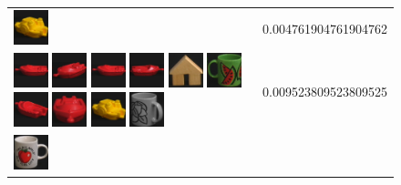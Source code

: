 \begin{figure}[tbp]
\begin{center}
\begin{tabular}{m{11cm} | m{3cm} |}
\includegraphics[width=1cm]{coil/beeld-16.eps}
& {\scriptsize 0.004761904761904762}
\\
\includegraphics[width=1cm]{coil/beeld-18.eps}
\includegraphics[width=1cm]{coil/beeld-21.eps}
\includegraphics[width=1cm]{coil/beeld-18.eps}
\includegraphics[width=1cm]{coil/beeld-19.eps}
\includegraphics[width=1cm]{coil/beeld-42.eps}
\includegraphics[width=1cm]{coil/beeld-31.eps}
\includegraphics[width=1cm]{coil/beeld-22.eps}
\includegraphics[width=1cm]{coil/beeld-20.eps}
\includegraphics[width=1cm]{coil/beeld-16.eps}
\includegraphics[width=1cm]{coil/beeld-49.eps}
& {\scriptsize 0.009523809523809525}
\\
\includegraphics[width=1cm]{coil/beeld-36.eps}

\end{tabular}
\end{center}
\end{figure}
